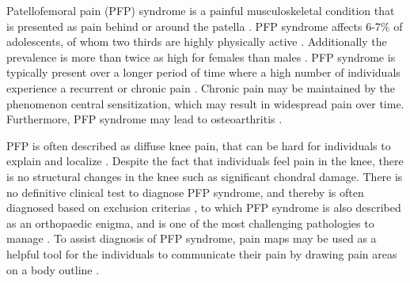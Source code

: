 Patellofemoral pain (PFP) syndrome is a painful musculoskeletal condition that is presented as pain behind or around the patella \citep{Maclachlan2017, Smith2015}. PFP syndrome affects 6-7\% of adolescents, of whom two thirds are highly physically active \citep{Rathleff2015}. Additionally the prevalence is more than twice as high for females than males \citep{Rathleff2015, Petersen2013}.
PFP syndrome is typically present over a longer period of time where a high number of individuals experience a recurrent or chronic pain \citep{Witvrouw2014}. Chronic pain may be maintained by the phenomenon central sensitization, which may result in widespread pain over time. Furthermore, PFP syndrome may lead to osteoarthritis \citep{Petersen2013, Crossley2016}. 

\noindent
PFP is often described as diffuse knee pain, that can be hard for individuals to explain and localize \citep{Witvrouw2014}. Despite the fact that individuals feel pain in the knee, there is no structural changes in the knee such as significant chondral damage. There is no definitive clinical test to diagnose PFP syndrome, and thereby is often diagnosed based on exclusion criterias \citep{Petersen2013}, to which PFP syndrome is also described as an orthopaedic enigma, and is one of the most challenging pathologies to manage \citep{Dye2001}.
To assist diagnosis of PFP syndrome, pain maps may be used as a helpful tool for the individuals to communicate their pain by drawing pain areas on a body outline \citep{Boudreau2016}.

